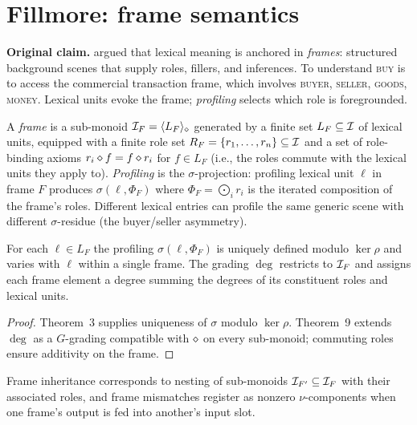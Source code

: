 \section{Fillmore: frame semantics}\label{sec:cogsci-fillmore}

\textbf{Original claim.} \citet{Fillmore1982} argued that lexical meaning
is anchored in \emph{frames}: structured background scenes that supply
roles, fillers, and inferences. To understand \textsc{buy} is to access
the commercial transaction frame, which involves \textsc{buyer},
\textsc{seller}, \textsc{goods}, \textsc{money}. Lexical units evoke the
frame; \emph{profiling} selects which role is foregrounded.

\formalclaim A \emph{frame} is a sub-monoid $\mathcal{I}_F=\langle
L_F\rangle_{\mathbin{\diamond}}$ generated by a finite set $L_F\subseteq\mathcal{I}$ of
lexical units, equipped with a finite role set
$R_F=\{r_1,\dots,r_n\}\subseteq\mathcal{I}$ and a set of role-binding axioms
$r_i\mathbin{\diamond} f = f\mathbin{\diamond} r_i$ for $f\in L_F$ (i.e., the roles commute
with the lexical units they apply to). \emph{Profiling} is the
$\sigma$-projection: profiling lexical unit $\ell$ in frame $F$ produces
$\sigma(\ell,\Phi_F)$ where $\Phi_F=\bigodot_{i}r_i$ is the iterated
composition of the frame's roles. Different lexical entries can profile
the same generic scene with different $\sigma$-residue (the buyer/seller
asymmetry).

\begin{corollary}\label{cor:cogsci-frames}
For each $\ell\in L_F$ the profiling $\sigma(\ell,\Phi_F)$ is uniquely
defined modulo $\ker\rho$ and varies with $\ell$ within a single frame.
The grading $\deg$ restricts to $\mathcal{I}_F$ and assigns each frame element
a degree summing the degrees of its constituent roles and lexical units.
\end{corollary}

\begin{proof}
Theorem~3 supplies uniqueness of $\sigma$ modulo $\ker\rho$. Theorem~9
extends $\deg$ as a $G$-grading compatible with $\mathbin{\diamond}$ on every
sub-monoid; commuting roles ensure additivity on the frame. \qedhere
\end{proof}

Frame inheritance \citep{Fillmore1982} corresponds to nesting of
sub-monoids $\mathcal{I}_{F'}\subseteq\mathcal{I}_F$ with their associated roles,
and frame mismatches register as nonzero $\nu$-components when one frame's
output is fed into another's input slot.

